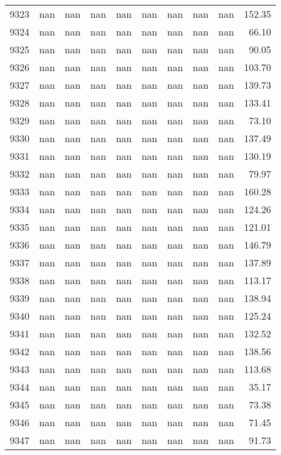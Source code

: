 \begin{tabular}{lrrrrrrrrr}
9323 & nan & nan & nan & nan & nan & nan & nan & nan & 152.35 \\
9324 & nan & nan & nan & nan & nan & nan & nan & nan & 66.10 \\
9325 & nan & nan & nan & nan & nan & nan & nan & nan & 90.05 \\
9326 & nan & nan & nan & nan & nan & nan & nan & nan & 103.70 \\
9327 & nan & nan & nan & nan & nan & nan & nan & nan & 139.73 \\
9328 & nan & nan & nan & nan & nan & nan & nan & nan & 133.41 \\
9329 & nan & nan & nan & nan & nan & nan & nan & nan & 73.10 \\
9330 & nan & nan & nan & nan & nan & nan & nan & nan & 137.49 \\
9331 & nan & nan & nan & nan & nan & nan & nan & nan & 130.19 \\
9332 & nan & nan & nan & nan & nan & nan & nan & nan & 79.97 \\
9333 & nan & nan & nan & nan & nan & nan & nan & nan & 160.28 \\
9334 & nan & nan & nan & nan & nan & nan & nan & nan & 124.26 \\
9335 & nan & nan & nan & nan & nan & nan & nan & nan & 121.01 \\
9336 & nan & nan & nan & nan & nan & nan & nan & nan & 146.79 \\
9337 & nan & nan & nan & nan & nan & nan & nan & nan & 137.89 \\
9338 & nan & nan & nan & nan & nan & nan & nan & nan & 113.17 \\
9339 & nan & nan & nan & nan & nan & nan & nan & nan & 138.94 \\
9340 & nan & nan & nan & nan & nan & nan & nan & nan & 125.24 \\
9341 & nan & nan & nan & nan & nan & nan & nan & nan & 132.52 \\
9342 & nan & nan & nan & nan & nan & nan & nan & nan & 138.56 \\
9343 & nan & nan & nan & nan & nan & nan & nan & nan & 113.68 \\
9344 & nan & nan & nan & nan & nan & nan & nan & nan & 35.17 \\
9345 & nan & nan & nan & nan & nan & nan & nan & nan & 73.38 \\
9346 & nan & nan & nan & nan & nan & nan & nan & nan & 71.45 \\
9347 & nan & nan & nan & nan & nan & nan & nan & nan & 91.73 \\

\end{tabular}

